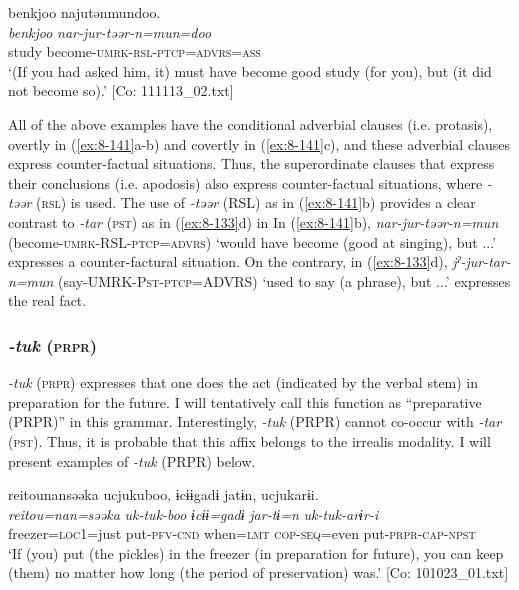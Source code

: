 
{\TM}
\glll  {\textbar}benkjoo{\textbar}  najutənmundoo.\\
\textit{benkjoo}  \textit{nar-jur-təər-n=mun=doo}\\
study  become-\textsc{umrk}-\textsc{rsl}-\textsc{ptcp}=\textsc{advrs}=\textsc{ass}\\
\glt ‘(If you had asked him, it) must have become good study (for you), but (it did not become so).’ [Co: 111113\_02.txt]
\z
\z

All of the above examples have the conditional adverbial clauses (i.e. protasis), overtly in (\ref{ex:8-141}a-b) and covertly in (\ref{ex:8-141}c), and these adverbial clauses express counter-factual situations. Thus, the superordinate clauses that express their conclusions (i.e. apodosis) also express counter-factual situations, where \textit{-təər} (\textsc{rsl}) is used. The use of \textit{-təər} (RSL) as in (\ref{ex:8-141}b) provides a clear contrast to \textit{-tar} (\textsc{pst}) as in (\ref{ex:8-133}d) in  In (\ref{ex:8-141}b), \textit{nar-jur-təər-n=mun} (become-\textsc{umrk}-RSL-\textsc{ptcp}=\textsc{advrs}) ‘would have become (good at singing), but ...’ expresses a counter-factural situation. On the contrary, in (\ref{ex:8-133}d), \textit{jˀ-jur-tar-n=mun} (say-UMRK-P\textsc{st}-\textsc{ptcp}=ADVRS) ‘used to say (a phrase), but ...’ expresses the real fact.

\subsubsection{\textit{-tuk} (\textsc{prpr})}

\textit{-tuk} (\textsc{prpr}) expresses that one does the act (indicated by the verbal stem) in preparation for the future. I will tentatively call this function as “preparative (PRPR)” in this grammar. Interestingly, \textit{-tuk} (PRPR) cannot co-occur with \textit{-tar} (\textsc{pst}). Thus, it is probable that this affix belongs to the irrealis modality. I will present examples of \textit{-tuk} (PRPR) below.

\ea\label{ex:8-142}
\ea [= (\ref{ex:8-44}a)]

{\TM}
\glll  {\textbar}reitou{\textbar}nansəəka  ucjukuboo,  ɨcɨɨgadɨ  jatɨn,      ucjukarɨi.\\
\textit{reitou=nan=səəka}  \textit{uk-tuk-boo}  \textit{ɨcɨɨ=gadɨ}  \textit{jar-tɨ=n}      \textit{uk-tuk-arɨr-i}
\\
freezer=\textsc{loc}1=just  put-\textsc{pfv}-\textsc{cnd}  when=\textsc{lmt}  \textsc{cop}-\textsc{seq}=even  put-\textsc{prpr}-\textsc{cap}-\textsc{npst}\\
\glt ‘If (you) put (the pickles) in the freezer (in preparation for future), you can keep (them) no matter how long (the period of preservation) was.’ [Co: 101023\_01.txt]


